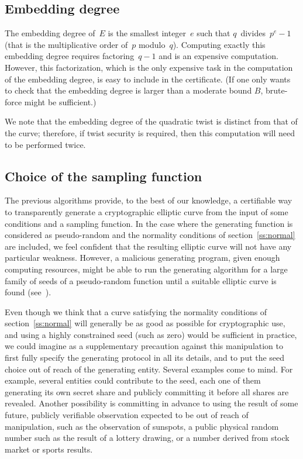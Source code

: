 \documentclass[twocolumn,letterpaper,10pt]{article}
\begin{document}
\subsection{Embedding degree}

The embedding degree of~$E$ is the smallest integer~$e$
such that $q$~divides~$p^{e}-1$
(that is the multiplicative order of~$p$ modulo~$q$).
Computing exactly this embedding degree requires factoring~$q-1$
and is an expensive computation.
However, this factorization, which is the only expensive task
in the computation of the embedding degree,
is easy to include in the certificate.
(If one only wants to check that the embedding degree
is larger than a moderate bound $B$,
brute-force might be sufficient.)

We note that the embedding degree of the quadratic twist
is distinct from that of the curve;
therefore, if twist security is required,
then this computation will need to be performed twice.

\subsection{Choice of the sampling function}

The previous algorithms provide, to the best of our knowledge,
a certifiable way to transparently generate a cryptographic elliptic curve
from the input of some conditions and a sampling function.
In the case where the generating function is considered as pseudo-random
and the normality conditions of section~\ref{ss:normal} are included,
we feel confident that the resulting elliptic curve
will not have any particular weakness.
However, a malicious generating program, given enough computing resources,
might be able to run the generating algorithm
for a large family of seeds of a pseudo-random function
until a suitable elliptic curve is found (see~\cite{badass}).

Even though we think that a curve satisfying the normality conditions
of section~\ref{ss:normal} will generally be as good as possible
for cryptographic use,
and using a highly constrained seed (such as zero)
would be sufficient in practice,
we could imagine as a supplementary precaution against this manipulation
to first fully specify the generating protocol in all its details,
and to put the seed choice out of reach of the generating entity.
Several examples come to mind.
For example, several entities could contribute to the seed,
each one of them generating its own secret share
and publicly committing it before all shares are revealed.
Another possibility is committing in advance to using
the result of some future, publicly verifiable observation
expected to be out of reach of manipulation,
such as the observation of sunspots,
a public physical random number such as the result of a lottery drawing,
or a number derived from stock market or sports results.
\end{document}
